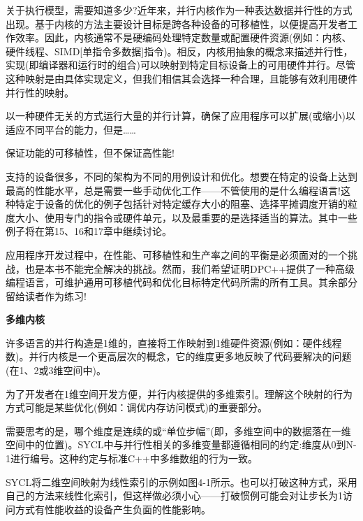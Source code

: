 关于执行模型，需要知道多少?近年来，并行内核作为一种表达数据并行性的方式出现。基于内核的方法主要设计目标是跨各种设备的可移植性，以便提高开发者工作效率。因此，内核通常不是硬编码处理特定数量或配置硬件资源(例如：内核、硬件线程、SIMD[单指令多数据]指令)。相反，内核用抽象的概念来描述并行性，实现(即编译器和运行时的组合)可以映射到特定目标设备上的可用硬件并行。尽管这种映射是由具体实现定义，但我们相信其会选择一种合理，且能够有效利用硬件并行性的映射。\par

以一种硬件无关的方式运行大量的并行计算，确保了应用程序可以扩展(或缩小)以适应不同平台的能力，但是……\par

\begin{tcolorbox}[colback=red!5!white,colframe=red!75!black]
保证功能的可移植性，但不保证高性能!
\end{tcolorbox}

支持的设备很多，不同的架构为不同的用例设计和优化。想要在特定的设备上达到最高的性能水平，总是需要一些手动优化工作——不管使用的是什么编程语言!这种特定于设备的优化的例子包括针对特定缓存大小的阻塞、选择平摊调度开销的粒度大小、使用专门的指令或硬件单元，以及最重要的是选择适当的算法。其中一些例子将在第15、16和17章中继续讨论。\par

应用程序开发过程中，在性能、可移植性和生产率之间的平衡是必须面对的一个挑战，也是本书不能完全解决的挑战。然而，我们希望证明DPC++提供了一种高级编程语言，可维护通用可移植代码和优化目标特定代码所需的所有工具。其余部分留给读者作为练习!\par

\hspace*{\fill} \par %
\textbf{多维内核}

许多语言的并行构造是1维的，直接将工作映射到1维硬件资源(例如：硬件线程数)。并行内核是一个更高层次的概念，它的维度更多地反映了代码要解决的问题(在1、2或3维空间中)。\par

为了开发者在1维空间开发方便，并行内核提供的多维索引。理解这个映射的行为方式可能是某些优化(例如：调优内存访问模式)的重要部分。\par

需要思考的是，哪个维度是连续的或“单位步幅”(即，多维空间中的数据落在一维空间中的位置)。SYCL中与并行性相关的多维变量都遵循相同的约定:维度从0到N-1进行编号。这种约定与标准C++中多维数组的行为一致。\par

SYCL将二维空间映射为线性索引的示例如图4-1所示。也可以打破这种方式，采用自己的方法来线性化索引，但这样做必须小心——打破惯例可能会对让步长为1访问方式有性能收益的设备产生负面的性能影响。\par

